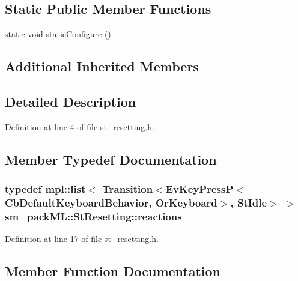 \subsection*{Static Public Member Functions}
\begin{DoxyCompactItemize}
\item 
static void \hyperlink{structsm__packML_1_1StResetting_a4c1f24d4cab96fd914b31e41c21ab98e}{static\+Configure} ()
\end{DoxyCompactItemize}
\subsection*{Additional Inherited Members}


\subsection{Detailed Description}


Definition at line 4 of file st\+\_\+resetting.\+h.



\subsection{Member Typedef Documentation}
\subsubsection[{\texorpdfstring{reactions}{reactions}}]{\setlength{\rightskip}{0pt plus 5cm}typedef mpl\+::list$<$ Transition$<$Ev\+Key\+PressP$<$Cb\+Default\+Keyboard\+Behavior, {\bf Or\+Keyboard}$>$, {\bf St\+Idle}$>$ $>$ {\bf sm\+\_\+pack\+M\+L\+::\+St\+Resetting\+::reactions}}\hypertarget{structsm__packML_1_1StResetting_a757c61e9580be9f47758c7e58f08a135}{}\label{structsm__packML_1_1StResetting_a757c61e9580be9f47758c7e58f08a135}


Definition at line 17 of file st\+\_\+resetting.\+h.



\subsection{Member Function Documentation}
